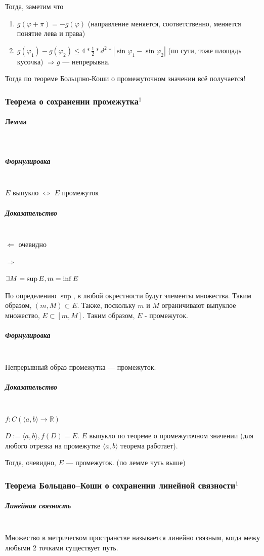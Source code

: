 \documentclass{article}
\def\letus{%
\mathord{\setbox0=\hbox{$\exists$}%
         \hbox{\kern 0.125\wd0%
               \vbox to \ht0{%
                  \hrule width 0.75\wd0%
                  \vfill%
                  \hrule width 0.75\wd0}%
               \vrule height \ht0%
               \kern 0.125\wd0}%
       }%
        }
\let\vanillaparagraph\paragraph
\let\vanillasubparagraph\subparagraph
\renewcommand{\paragraph}[1]{\vanillaparagraph{#1}\mbox{}\\}
\renewcommand{\subparagraph}[1]{\vanillasubparagraph{#1}\mbox{}\\}
\begin{document}
Тогда, заметим что

\begin{enumerate}
    \item $g(\varphi + \pi) = -g(\varphi)$ (направление меняется, соответственно, меняется понятие лева и права)
    \item $g(\varphi_1) - g(\varphi_2) \le 4 * \frac{1}{2} * d^2 * |\sin \varphi_1 - \sin \varphi_2|$ (по сути, тоже площадь кусочка) $\Rightarrow g$ --- непрерывна.
\end{enumerate}

Тогда по теореме Больцпно-Коши о промежуточном значении всё получается!


\subsubsection{Теорема о сохранении промежутка\texorpdfstring{$^1$}{}}
\label{СохрПромеж}

\paragraph{Лемма}
\subparagraph{Формулировка}
$E$ выпукло $\Leftrightarrow$ $E$ промежуток

\subparagraph{Доказательство}
$\Leftarrow$ очевидно

$\Rightarrow$

$\letus M = \sup E, m = \inf E$

По определению $\sup$, в любой окрестности будут элементы множества. Таким образом, $(m, M) \subset E$. Также, поскольку $m$ и $M$ ограничивают выпуклое множество, $E \subset [m, M]$. Таким образом, $E$ - промежуток. 

\subparagraph{Формулировка}
Непрерывный образ промежутка --- промежуток. 

\subparagraph{Доказательство}
$f: C(\langle a, b \rangle \rightarrow \mathbb{R})$

$D := \langle a, b \rangle, f(D) = E$. $E$ выпукло по теореме о промежуточном значении (для любого отрезка на промежутке $\langle a, b \rangle$ теорема работает). 

Тогда, очевидно, $E$ --- промежуток. (по лемме чуть выше)


\subsubsection{Теорема Больцано--Коши о сохранении линейной связности\texorpdfstring{$^1$}{}}
\subparagraph{Линейная связность}
Множество в метрическом пространстве называется линейно связным, когда межу любыми 2 точками существует путь.
\end{document}
